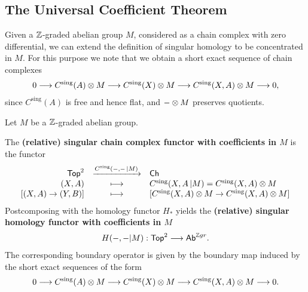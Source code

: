 	\newpage
	\subsection{The Universal Coefficient Theorem}

	Given a $\mathbb{Z}$-graded abelian group $M$, considered as a chain complex with zero differential, we can extend the definition of singular homology to be concentrated in $M$. For this purpose we note that we obtain a short exact sequence of chain complexes
	\begin{align*}
		0 --> C^\text{sing}(A) \otimes M --> C^\text{sing}(X) \otimes M --> C^\text{sing}(X,A) \otimes M --> 0,
	\end{align*}
	since $C^\text{sing}(A)$ is free and hence flat, and $- \otimes M$ preserves quotients.

	\begin{definition}
		Let $M$ be a $\mathbb{Z}$-graded abelian group.

		The \textbf{(relative) singular chain complex functor with coefficients in $M$} is the functor
		\begin{equation*}
			\begin{array}{rcl}
				\textsf{Top}^2 & \xrightarrow{C^\text{sing}(-,- \,| M)} & \textsf{Ch}\\
				(X,A) & \longmapsto & C^\text{sing}(X,A \,| M) = C^\text{sing}(X,A) \otimes M\\
				{[(X,A)\rightarrow(Y,B)]} & \longmapsto & {[C^\text{sing}(X,A) \otimes M \rightarrow C^\text{sing}(X,A) \otimes M]}
			\end{array}
		\end{equation*}
		Postcomposing with the homology functor $H_{*}$ yields the \textbf{(relative) singular homology functor with coefficients in $M$}
		\begin{align*}
			H(-,- | M): \textsf{Top}^2 --> \textsf{Ab}^{\mathbb{Z} gr}.
		\end{align*}
		The corresponding boundary operator is given by the boundary map induced by the short exact sequences of the form
		\begin{align*}
			0 --> C^\text{sing}(A) \otimes M --> C^\text{sing}(X) \otimes M --> C^\text{sing}(X,A) \otimes M --> 0.
		\end{align*}
	\end{definition}


